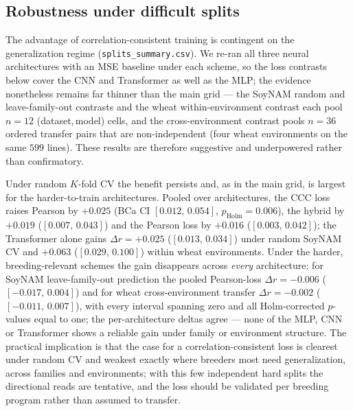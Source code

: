 \subsection{Robustness under difficult splits}\label{sec:res-splits}
The advantage of correlation-consistent training is contingent on the generalization regime (\texttt{splits\_summary.csv}). We re-ran all three neural architectures with an MSE baseline under each scheme, so the loss contrasts below cover the CNN and Transformer as well as the MLP; the evidence nonetheless remains far thinner than the main grid --- the SoyNAM random and leave-family-out contrasts and the wheat within-environment contrast each pool $n=12$ (dataset,\,model) cells, and the cross-environment contrast pools $n=36$ ordered transfer pairs that are non-independent (four wheat environments on the same $599$ lines). These results are therefore suggestive and underpowered rather than confirmatory.

Under random $K$-fold CV the benefit persists and, as in the main grid, is largest for the harder-to-train architectures. Pooled over architectures, the CCC loss raises Pearson by $+0.025$ (BCa CI $[0.012,\,0.054]$, $p_{\mathrm{Holm}}=0.006$), the hybrid by $+0.019$ ($[0.007,\,0.043]$) and the Pearson loss by $+0.016$ ($[0.003,\,0.042]$); the Transformer alone gains $\Delta r=+0.025$ ($[0.013,\,0.034]$) under random SoyNAM CV and $+0.063$ ($[0.029,\,0.100]$) within wheat environments. Under the harder, breeding-relevant schemes the gain disappears across \emph{every} architecture: for SoyNAM leave-family-out prediction the pooled Pearson-loss $\Delta r=-0.006$ ($[-0.017,\,0.004]$) and for wheat cross-environment transfer $\Delta r=-0.002$ ($[-0.011,\,0.007]$), with every interval spanning zero and all Holm-corrected $p$-values equal to one; the per-architecture deltas agree --- none of the MLP, CNN or Transformer shows a reliable gain under family or environment structure. The practical implication is that the case for a correlation-consistent loss is clearest under random CV and weakest exactly where breeders most need generalization, across families and environments; with this few independent hard splits the directional reads are tentative, and the loss should be validated per breeding program rather than assumed to transfer.

